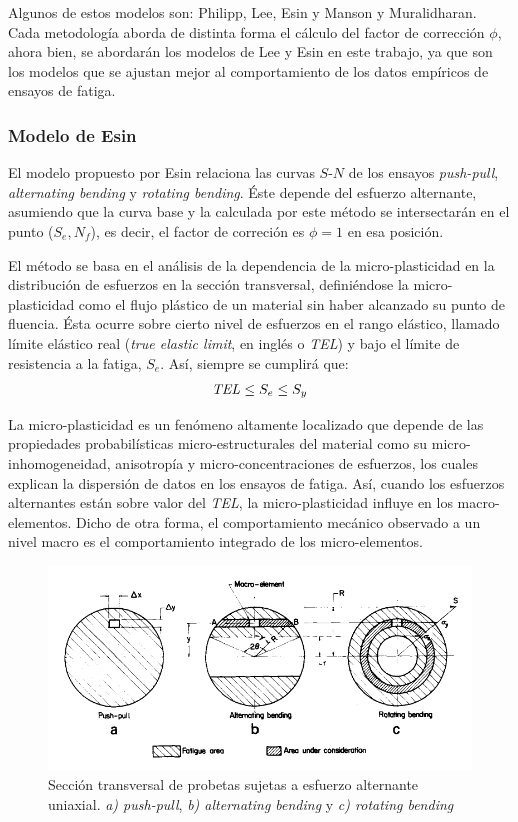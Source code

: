 Algunos de estos modelos son: Philipp, Lee, Esin y Manson y Muralidharan. Cada metodología aborda de distinta forma el cálculo del factor de corrección $\phi$, ahora bien, se abordarán los modelos de Lee y Esin en este trabajo, ya que son los modelos que se ajustan mejor al comportamiento de los datos empíricos de ensayos de fatiga.\cite{strzelecki2018analysis}

\subsubsection{Modelo de Esin}
El modelo propuesto por Esin \cite{esin1980method} relaciona las curvas $S$-$N$ de los ensayos \textit{push-pull}, \textit{alternating bending} y \textit{rotating bending}. Éste depende del esfuerzo alternante, asumiendo que la curva base y la calculada por este método se intersectarán en el punto ($S_e,N_f$), es decir, el factor de correción es $\phi=1$ en esa posición. 

El método se basa en el análisis de la dependencia de la micro-plasticidad en la distribución de esfuerzos en la sección transversal, definiéndose la micro-plasticidad como el flujo plástico de un material sin haber alcanzado su punto de fluencia. Ésta ocurre sobre cierto nivel de esfuerzos en el rango elástico, llamado límite elástico real (\textit{true elastic limit}, en inglés o \textit{TEL}) y bajo el límite de resistencia a la fatiga, $S_e$. Así, siempre se cumplirá que:
\begin{align*}
	\text{\textit{TEL}} \leq S_e \leq S_y
\end{align*}

La micro-plasticidad es un fenómeno altamente localizado que depende de las propiedades probabilísticas micro-estructurales del material como su micro-inhomogeneidad, anisotropía y micro-concentraciones de esfuerzos, los cuales explican la dispersión de datos en los ensayos de fatiga. Así, cuando los esfuerzos alternantes están sobre valor del  \textit{TEL}, la micro-plasticidad influye en los macro-elementos. Dicho de otra forma, el comportamiento mecánico observado a un nivel macro es el comportamiento integrado de los micro-elementos.

\begin{figure}[h]
\centering
\includegraphics[scale=1]{Imagenes/affectedarea_fatigue.pdf}
\caption{Sección transversal de probetas sujetas a esfuerzo alternante uniaxial. \textit{a) push-pull}, \textit{b) alternating bending} y \textit{c) rotating bending}}
\label{fig:affar_fat}
\end{figure}

